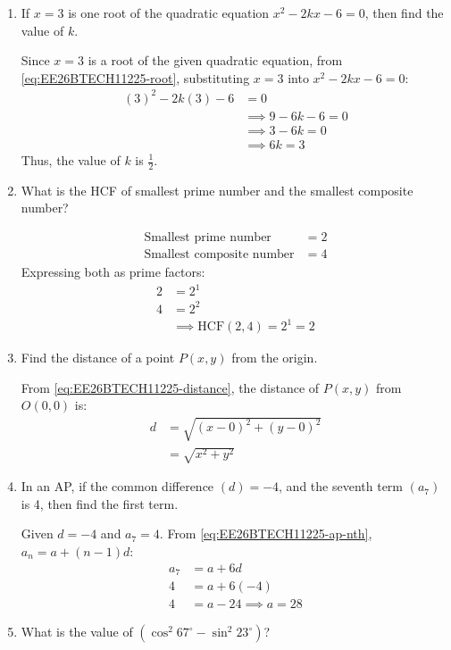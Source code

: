 \begin{enumerate}[label=\thesubsection.\arabic*, ref=\thesubsection.\theenumi]
    \item If $x = 3$ is one root of the quadratic equation $x^2 - 2kx - 6 = 0$, then find the value of $k$.

\solution Since $x = 3$ is a root of the given quadratic equation, from \eqref{eq:EE26BTECH11225-root}, substituting $x = 3$ into $x^2 - 2kx - 6 = 0$:
\begin{align}
    (3)^2 - 2k(3) - 6 &= 0 \\
    &\implies 9 - 6k - 6 = 0 \\
    &\implies 3 - 6k = 0 \\
    &\implies 6k = 3 
\end{align}
Thus, the value of $k$ is $\frac{1}{2}$.
    \item What is the HCF of smallest prime number and the smallest composite number?

\solution 
\begin{align}
    \text{Smallest prime number} &= 2 \\
    \text{Smallest composite number} &= 4
\end{align}
Expressing both as prime factors:
\begin{align}
    2 &= 2^1 \\
    4 &= 2^2 \\
    &\implies \text{HCF}(2, 4) = 2^1 = 2
\end{align}
    \item Find the distance of a point $P(x, y)$ from the origin.

\solution From \eqref{eq:EE26BTECH11225-distance}, the distance of $P(x, y)$ from $O(0, 0)$ is:
\begin{align}
    d &= \sqrt{(x - 0)^2 + (y - 0)^2} \\
    &= \sqrt{x^2 + y^2}
\end{align}
    \item In an AP, if the common difference $(d) = -4$, and the seventh term $(a_7)$ is 4, then find the first term.

\solution Given $d = -4$ and $a_7 = 4$. From \eqref{eq:EE26BTECH11225-ap-nth}, $a_n = a + (n-1)d$:
\begin{align}
    a_7 &= a + 6d \\
    4 &= a + 6(-4) \\
    4 &= a - 24 \implies a = 28
\end{align}
	\item What is the value of $(\cos^2 67^\circ - \sin^2 23^\circ)$?


\end{enumerate}
